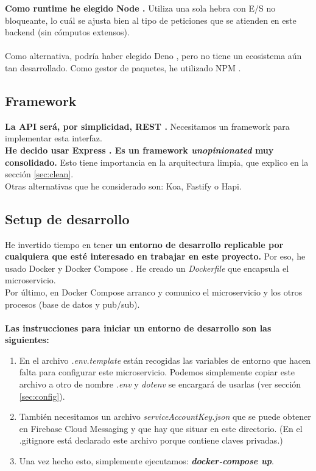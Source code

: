 \textbf{Como runtime he elegido Node \cite{nodejs}.} Utiliza una sola hebra con E/S no bloqueante, lo cuál se ajusta bien al tipo 
de peticiones que se atienden en este backend (sin cómputos extensos).  \\ \\
Como alternativa, podría haber elegido Deno \cite{deno}, pero no tiene un ecosistema aún tan desarrollado.
Como gestor de paquetes, he utilizado NPM \cite{npm}.

\subsection{Framework}
\textbf{La API será, por simplicidad, REST \cite{rest}.} Necesitamos un framework para implementar esta interfaz. \\

\textbf{He decido usar Express \cite{express}. Es un framework \textit{unopinionated} muy consolidado.} Esto tiene importancia en la 
arquitectura limpia, que explico en la sección \ref{sec:clean}. \\
Otras alternativas que he considerado son: Koa, Fastify o Hapi.

\subsection{Setup de desarrollo}\label{sec:dev}

He invertido tiempo en tener \textbf{un entorno de desarrollo replicable por cualquiera que esté interesado en trabajar en este proyecto.}
Por eso, he usado Docker y Docker Compose \cite{docker}. He creado un \textit{Dockerfile} que encapsula el microservicio. 
\\ Por último, en Docker Compose arranco y comunico el microservicio y los otros procesos (base de datos y pub/sub). \\ \\
\textbf{Las instrucciones para iniciar un entorno de desarrollo son las siguientes:}

\begin{enumerate}
	\item En el archivo \textit{.env.template} están recogidas las variables de entorno que hacen falta para configurar este microservicio.
Podemos simplemente copiar este archivo a otro de nombre \textit{.env} y \textit{dotenv} se encargará de usarlas (ver sección \ref{sec:config}).
\item También necesitamos un archivo \textit{serviceAccountKey.json} que se puede obtener en Firebase Cloud Messaging \cite{firebase} y que hay que situar en este directorio. 
(En el .gitignore está declarado este archivo porque contiene claves privadas.)
\item Una vez hecho esto, simplemente ejecutamos: \textbf{\textit{docker-compose up}}.
\end{enumerate}

